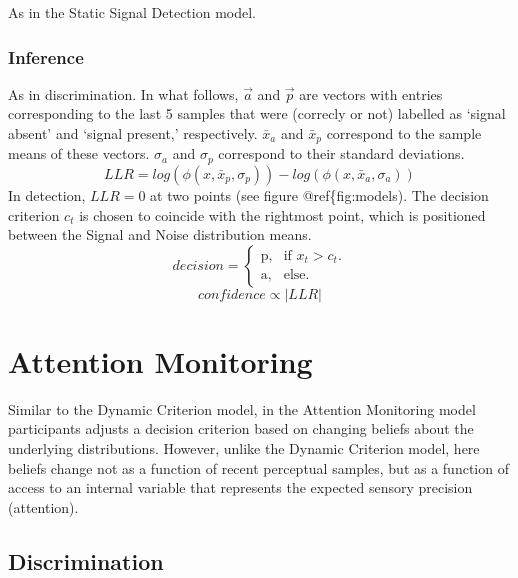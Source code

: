 \documentclass[12pt,twoside]{reedthesis}
\begin{document}
As in the Static Signal Detection model.

\hypertarget{inference-5}{%
\subsubsection*{Inference}\label{inference-5}}

As in discrimination. In what follows, \(\vec{a}\) and \(\vec{p}\) are vectors with entries corresponding to the last 5 samples that were (correcly or not) labelled as `signal absent' and `signal present,' respectively. \(\bar{x}_{a}\) and \(\bar{x}_{p}\) correspond to the sample means of these vectors. \(\sigma_{a}\) and \(\sigma_{p}\) correspond to their standard deviations.
\begin{equation}
LLR = log(\phi(x,\bar{x}_{p},\sigma_{p}))-log(\phi(x,\bar{x}_{a},\sigma_{a}))
\end{equation}
In detection, \(LLR=0\) at two points (see figure @ref\{fig:models). The decision criterion \(c_t\) is chosen to coincide with the rightmost point, which is positioned between the Signal and Noise distribution means.
\begin{equation}
  decision=\begin{cases}
    \text{p}, & \text{if } x_t>c_t.\\
    \text{a}, & \text{else}.
  \end{cases}
\end{equation}
\begin{equation}
confidence \propto |LLR|
\end{equation}
\hypertarget{app3-Monitoring}{%
\section{Attention Monitoring}\label{app3-Monitoring}}

Similar to the Dynamic Criterion model, in the Attention Monitoring model participants adjusts a decision criterion based on changing beliefs about the underlying distributions. However, unlike the Dynamic Criterion model, here beliefs change not as a function of recent perceptual samples, but as a function of access to an internal variable that represents the expected sensory precision (attention).

\hypertarget{discrimination-3}{%
\subsection{Discrimination}\label{discrimination-3}}
\end{document}
